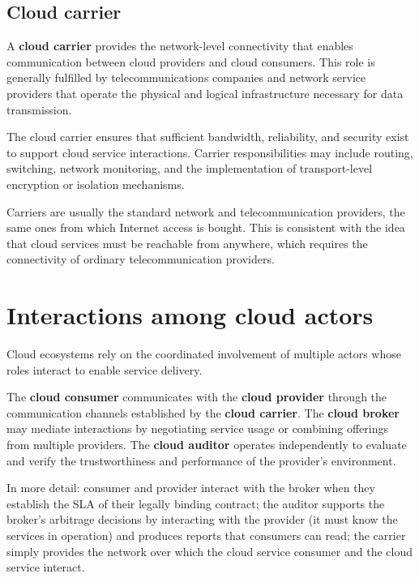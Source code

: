 \subsection{Cloud carrier}

A \textbf{cloud carrier} provides the network-level connectivity that enables communication between cloud providers and cloud consumers. This role is generally fulfilled by telecommunications companies and network service providers that operate the physical and logical infrastructure necessary for data transmission.

The cloud carrier ensures that sufficient bandwidth, reliability, and security exist to support cloud service interactions. Carrier responsibilities may include routing, switching, network monitoring, and the implementation of transport-level encryption or isolation mechanisms.

Carriers are usually the standard network and telecommunication providers, the same ones from which Internet access is bought. This is consistent with the idea that cloud services must be reachable from anywhere, which requires the connectivity of ordinary telecommunication providers.

\section{Interactions among cloud actors}

Cloud ecosystems rely on the coordinated involvement of multiple actors whose roles interact to enable service delivery.

The \textbf{cloud consumer} communicates with the \textbf{cloud provider} through the communication channels established by the \textbf{cloud carrier}. The \textbf{cloud broker} may mediate interactions by negotiating service usage or combining offerings from multiple providers. The \textbf{cloud auditor} operates independently to evaluate and verify the trustworthiness and performance of the provider's environment.

In more detail: consumer and provider interact with the broker when they establish the SLA of their legally binding contract; the auditor supports the broker's arbitrage decisions by interacting with the provider (it must know the services in operation) and produces reports that consumers can read; the carrier simply provides the network over which the cloud service consumer and the cloud service interact.

\begin{center}
\end{center}


